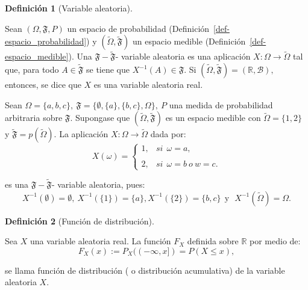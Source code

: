 \documentclass[
  us-letterpaper,
]{scrreprt}
\theoremstyle{plain}
\theoremstyle{plain}
\theoremstyle{definition}
\newtheorem{definition}{Definición}[chapter]
\theoremstyle{remark}
\begin{document}
\begin{definition}[Variable
aleatoria]\protect\hypertarget{def-variable_aleatoria}{}\label{def-variable_aleatoria}

Sean \((\Omega,\mathfrak{F}, P)\) un espacio de probabilidad
(Definición~\ref{def-espacio_probabilidad}) y
\((\tilde{\Omega},\tilde{\mathfrak{F}})\) un espacio medible
(Definición~\ref{def-espacio_medible}). Una
\(\mathfrak{F}- {\tilde{\mathfrak{F}}}\)- variable aleatoria es una
aplicación \(X:\Omega\rightarrow \tilde{\Omega}\) tal que, para todo
\(A \in \tilde{\mathfrak{F}}\) se tiene que
\(X^{-1}(A) \in  \mathfrak{F}\). Si
\((\tilde{\Omega}, \tilde{\mathfrak{F}}) = (\mathbb{R},\mathcal{B}),\)
entonces, se dice que \(X\) es una variable aleatoria real.

\end{definition}

\begin{tcolorbox}[enhanced jigsaw, titlerule=0mm, opacityback=0, coltitle=black, bottomrule=.15mm, colbacktitle=quarto-callout-caution-color!10!white, toprule=.15mm, colback=white, arc=.35mm, colframe=quarto-callout-caution-color-frame, leftrule=.75mm, bottomtitle=1mm, left=2mm, toptitle=1mm, opacitybacktitle=0.6, breakable, title={Ejemplo (\textbf{\emph{Variable aleatoria}})}, rightrule=.15mm]

Sean
\(\Omega = \{a,b,c\}, \ \mathfrak{F} = \{ \emptyset, \{a\}, \{b, c\}, \Omega \},\ P\)
una medida de probabilidad arbitraria sobre \(\mathfrak{F}\). Supongase
que \((\tilde{\Omega}, \tilde{\mathfrak{F}})\) es un espacio medible con
\(\tilde{\Omega} = \{1,2\}\) y
\(\tilde{\mathfrak{F}} = p(\tilde{\Omega})\). La aplicación
\(X: \Omega \longrightarrow \tilde{\Omega}\) dada por:
\[X(\omega) = \left\{ \begin{array}{lcc} 1, & si \ \ \omega = a, \\ \\ 2, & si  \ \ \omega = b \ o \ w= c. \end{array} \right.\]

es una \(\mathfrak{F}-\mathfrak{\tilde{F}}\)- variable aleatoria, pues:
\[X^{-1}(\emptyset) = \emptyset, \ X^{-1}(\{1\}) = \{a\}, X^{-1}(\{2\}) = \{b,c\}\ \ \text{y} \ \ \ X^{-1}(\tilde{\Omega}) = \Omega.\]

\end{tcolorbox}

\begin{definition}[Función de
distribución]\protect\hypertarget{def-fun_distr}{}\label{def-fun_distr}

Sea \(X\) una variable aleatoria real. La función \(F_X\) definida sobre
\(\mathbb{R}\) por medio de:
\[F_X(x) := P_X((-\infty,x]) = P(X \leq x),\]

se llama función de distribución ( o distribución acumulativa) de la
variable aleatoria \(X\).

\end{definition}
\end{document}
